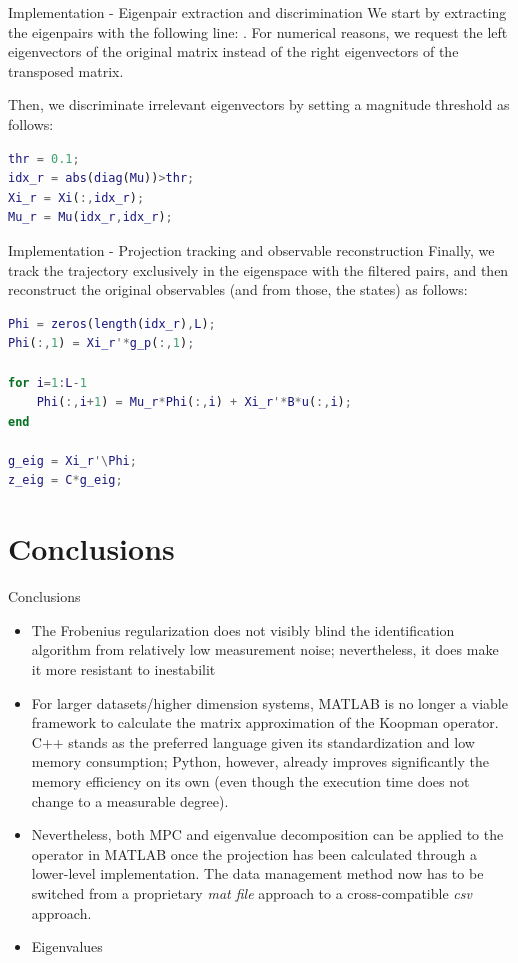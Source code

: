 \documentclass{beamer}
\begin{document}
\begin{frame}[fragile]{Implementation - Eigenpair extraction and discrimination}
    We start by extracting the eigenpairs with the following line: . For numerical reasons, we request the left eigenvectors of the original matrix instead of the right eigenvectors of the transposed matrix.

    Then, we discriminate irrelevant eigenvectors by setting a magnitude threshold as follows:

    \begin{lstlisting}[language=Matlab]
thr = 0.1;
idx_r = abs(diag(Mu))>thr;
Xi_r = Xi(:,idx_r);
Mu_r = Mu(idx_r,idx_r);
    \end{lstlisting}    
\end{frame}

\begin{frame}[fragile]{Implementation - Projection tracking and observable reconstruction}
    Finally, we track the trajectory exclusively in the eigenspace with the filtered pairs, and then reconstruct the original observables (and from those, the states) as follows:

    \begin{lstlisting}[language=Matlab]
Phi = zeros(length(idx_r),L);
Phi(:,1) = Xi_r'*g_p(:,1);

for i=1:L-1
    Phi(:,i+1) = Mu_r*Phi(:,i) + Xi_r'*B*u(:,i);
end

g_eig = Xi_r'\Phi;
z_eig = C*g_eig;
    \end{lstlisting}
\end{frame}


\section{Conclusions}

\begin{frame}[allowframebreaks]{Conclusions}
    \begin{itemize}
        \item The Frobenius regularization does not visibly blind the identification algorithm from relatively low measurement noise; nevertheless, it does make it more resistant to inestabilit
        \item For larger datasets/higher dimension systems, MATLAB is no longer a viable framework to calculate the matrix approximation of the Koopman operator. C++ stands as the preferred language given its standardization and low memory consumption; Python, however, already improves significantly the memory efficiency on its own (even though the execution time does not change to a measurable degree).
        \item Nevertheless, both MPC and eigenvalue decomposition can be applied to the operator in MATLAB once the projection has been calculated through a lower-level implementation. The data management method now has to be switched from a proprietary \textit{mat file} approach to a cross-compatible \textit{csv} approach.
        \item Eigenvalues 
    \end{itemize}
\end{frame}
\end{document}
